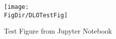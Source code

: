\hypertarget{DLOTestFig}{}
\begin{figure}[tbp]
\centerline{\texttt{[image: \\FigDir/DLOTestFig]}}
\caption{Test Figure from Jupyter Notebook}
\label{fig:DLOTestFig}
\end{figure}
